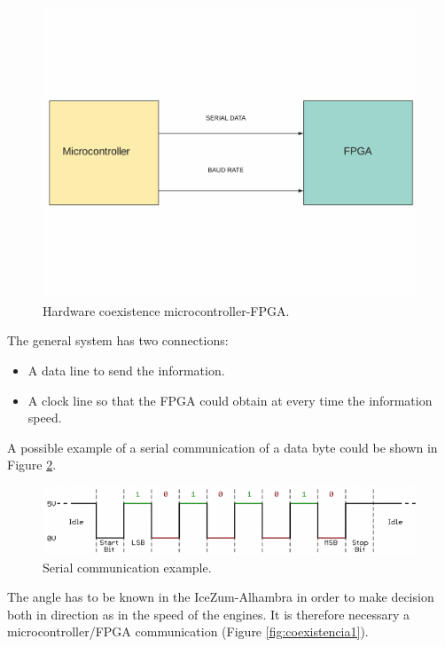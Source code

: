 \begin{figure}[H]
	\center
	\includegraphics[trim = 0mm 40mm 0mm 20mm, clip,scale=0.4]{imagenes/Balancing_robot/coexistencia2.pdf}
	\caption{Hardware coexistence microcontroller-FPGA.}
	\label{fig:coexistencia2}
\end{figure}
The general system has two connections:
\begin{itemize}
	\item A data line to send the information.
	\item A clock line so that the FPGA could obtain at every time the information speed.
\end{itemize}

A possible example of a serial communication of a data byte could be shown in Figure \ref{fig:serial_comunicattion}. 

\begin{center}
	\begin{figure}[H]
		\center
		\includegraphics[scale=0.75, angle=0]{imagenes/Balancing_Robot/serial_comunicattion.png}
		\caption{Serial communication example.}
		\label{fig:serial_comunicattion}
	\end{figure}
\end{center}

The angle has to be known in the IceZum-Alhambra in order to make decision both in direction as in the speed of the engines. It is therefore necessary a microcontroller/FPGA communication (Figure \ref{fig:coexistencia1}).


